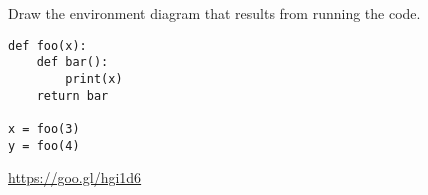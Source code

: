 \begin{blocksection}
\question Draw the environment diagram that results from running the code.

\begin{lstlisting}
def foo(x):
    def bar():
        print(x)
    return bar

x = foo(3)
y = foo(4)
\end{lstlisting}

\begin{solution}[2in]
\url{https://goo.gl/hgi1d6}
\end{solution}
\end{blocksection}

